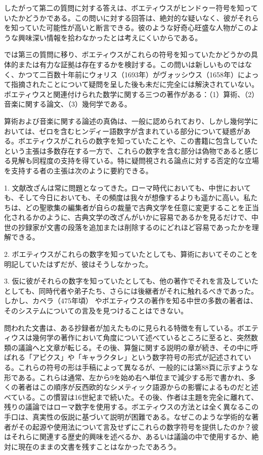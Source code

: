 \documentclass[a4paper,11pt,openany]{ltjsbook}
\begin{document}
したがって第二の質問に対する答えは、ボエティウスがヒンドゥー符号を知っていたかどうかである。この問いに対する回答は、絶対的な疑いなく、彼がそれらを知っていた可能性が高いと断言できる。彼のような好奇心旺盛な人物がこのような興味深い情報を拾わなかったとは考えにくいからである。

では第三の質問に移り、ボエティウスがこれらの符号を知っていたかどうかの具体的または有力な証拠は存在するかを検討する。この問いは新しいものではなく、かつて二百数十年前にウォリス（1693年）がヴォッシウス（1658年）によって指摘されたことについて疑問を呈した後も未だに完全には解決されていない。ボエティウスと関連付けられた数学に関する三つの著作がある：（1）算術、（2）音楽に関する論文、（3）幾何学である。

算術および音楽に関する論述の真偽は、一般に認められており、しかし幾何学においては、ゼロを含むヒンディー語数字が含まれている部分について疑惑がある。ボエティウスがこれらの数字を知っていたことや、この書籍に包含していたという主張は多数存在する一方で、これらの数字を含む部分は偽物であると感じる見解も同程度の支持を得ている。特に疑問視される論点に対する否定的な立場を支持する者の主張は次のように要約できる。

1. 文献改ざんは常に問題となってきた。ローマ時代においても、中世においても、そして今日においても、その頻度は我々が想像するよりも遥かに高い。私たちは、どの聖歌集の編集者が自らの裁量で古典文学を任意に変更することを正当化されるかのように、古典文学の改ざんがいかに容易であるかを見るだけで、中世の抄録家が文書の段落を追加または削除するのにどれほど容易であったかを理解できる。

2. ボエティウスがこれらの数字を知っていたとしても、算術においてそのことを明記していたはずだが、彼はそうしなかった。

3. 仮に彼がそれらの数字を知っていたとしても、他の著作でそれを言及していたとしても、同時代者や弟子たち、さらには後継者がそれに触れるべきであった。しかし、カペラ（475年頃） やボエティウスの著作を知る中世の多数の著者は、そのシステムについての言及を見つけることはできない。

問われた文書は、ある抄録者が加えたものに見られる特徴を有している。ボエティウスは幾何学の著作において角度について述べているところに至ると、突然数類の議論へと文章が転じる。その後、算盤に関する説明の章が続き、その中に呼ばれる「アピクス」や「キャラクタレ」という数字符号の形式が記述されている。これらの符号の形は手稿によって異なるが、一般的には第88頁に示すような形である。これらは通常、左から9を始め右へ単位まで減少する形で書かれ、多くの著者はこの順序が反西欧的なシメティック語源からの影響によるものだと述べている。この慣習は16世紀まで続いた。その後、作者は主題を完全に離れて、残りの議論ではローマ数字を使用する。ボエティウスの方法とは全く異なるこの手口は、真実性の仮説に基づいて説明が困難である。なぜこのような学術的な著者がその起源や使用法について言及せずにこれらの数字符号を提供したのか？彼はそれらに関連する歴史的興味を述べるか、あるいは議論の中で使用するか、絶対に現在のままの文書を残すことはなかったであろう。
\end{document}
